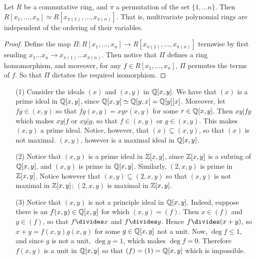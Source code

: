 \begin{proposition}\label{proposition_7.1.3}
  Let $R$ be a commutative ring, and  $\pi$ a permutation of the set  $\{1,
  \dots n\}$. Then $R[x_1, \dots, x_n] \simeq R[x_{\pi(1)}, \dots,
  x_{\pi(n)}]$. That is, multivariate polynomial rings are independent of the
  ordering of their variables.
\end{proposition}
\begin{proof}
  Define the map $\Pi:R[x_1, \dots, x_n] \xrightarrow{} R[x_{\pi(1)}, \dots,
  x_{\pi(n)}]$ termwise by first sending $x_1 \dots x_n \xrightarrow{}
  x_{\pi(1)} \dots x_{\pi(n)}$. Then notice that $\Pi$ defines a ring
  homomorphism, and moreover, for any  $f \in R[x_1, \dots, x_n]$, $\Pi$
  permutes the terms of $f$. So that  $\Pi$ dictates the required isomorphism.
\end{proof}

\begin{example}\label{label_7.3}
  \begin{enumerate}
    \item[(1)] Consider the ideals $(x)$ and $(x,y)$ in $\mathbb{Q}[x,y]$. We have
      that $(x)$ is a prime ideal in $\mathbb{Q}[x,y]$, since $\mathbb{Q}[x,y] \simeq
      \mathbb{Q}[y,x]=\mathbb{Q}[y][x]$. Moreover, let $fg \in (x,y)$ so that
      $fg(x,y)=xyr(x,y)$ for some $r \in \mathbb{Q}[x,y]$. Then $xy|fg$ which
      makes  $xy|f$ or  $xy|g$, so that $f \in (x,y)$ or $g \in (x,y)$.
      This makes $(x,y)$ a prime ideal. Notice, however, that $(x)
      \subseteq (x,y)$, so that $(x)$ is not maximal. $(x,y)$, however is
      a maximal ideal in $\mathbb{Q}[x,y]$.

    \item[(2)] Notice that $(x,y)$ is a prime ideal in $\mathbb{Z}[x,y]$, since
      $\mathbb{Z}[x,y]$ is a subring of $\mathbb{Q}[x,y]$, and $(x,y)$ is prime in
      $\mathbb{Q}[x,y]$. Similarly, $(2,x,y)$ is prime in $\mathbb{Z}[x,y]$. Notice
      however that $(x,y) \subseteq (2,x,y)$ so that $(x,y)$ is not
      maximal in $\mathbb{Z}[x,y]$; $(2,x,y)$ is maximal in $\mathbb{Z}[x,y]$.

    \item[(3)] Notice that $(x,y)$ is not a principle ideal in $\mathbb{Q}[x,y]$.
      Indeed, suppose there is an $f(x,y) \in \mathbb{Q}[x,y]$ for which
      $(x,y)=(f)$. Then $x \in (f)$ and $y \in (f)$, so that $f \divides
      x$ and  $f \divides y$. Hence $f \divides (x+y)$, so
      $x+y=f(x,y)g(x,y)$ for some $g \in \mathbb{Q}[x,y]$ not a unit. Now,
      $\deg{f} \leq 1$, and since $g$ is not a unit, $\deg{g}=1$, which
      makes $\deg{f}=0$. Therefore $f(x,y)$ is a unit in $\mathbb{Q}[x,y]$ so that
      $(f)=(1)=\mathbb{Q}[x,y]$ which is impossible.
  \end{enumerate}
\end{example}

